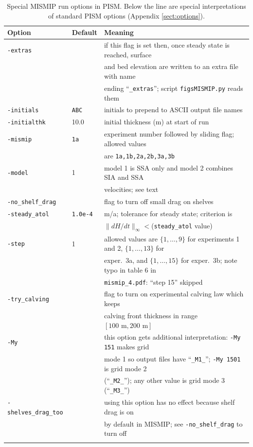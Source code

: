 \documentclass[11pt,final]{amsart}
\begin{document}
\begin{table}[ht]
\caption{Special MISMIP run options in PISM.  Below the line are special interpretations of standard PISM options (Appendix \ref{sect:options}).}\label{tab:MISMIPoptions}
\small
\begin{tabular}{@{}lll}\hline
\textbf{Option} & \textbf{Default} & \textbf{Meaning} \\ \hline
\verb|-extras| &  & if this flag is set then, once steady state is reached, surface \\
               &  & and bed elevation are written to an extra file with name \\
               &  & ending ``\verb|_extras|''; script \verb|figsMISMIP.py| reads them \\
\verb|-initials| & \verb|ABC| & initials to prepend to ASCII output file names \\
\verb|-initialthk| & 10.0 & initial thickness (m) at start of run \\
\verb|-mismip| & \verb|1a| & experiment number followed by sliding flag; allowed values \\
               &  & are \verb|1a,1b,2a,2b,3a,3b| \\
\verb|-model| & 1 & model 1 is SSA only and model 2 combines SIA and SSA  \\
              &   & velocities; see text \\
\verb|-no_shelf_drag| &  & flag to turn off small drag on shelves \\
\verb|-steady_atol| & \verb|1.0e-4| & m/a; tolerance for steady state; criterion is \\
                    & & $\|dH/dt\|_\infty <$(\verb|steady_atol| value) \\
\verb|-step| & 1 & allowed values are $\{1,\dots,9\}$ for experiments 1 and 2, $\{1,\dots,13\}$ for \\
             &  & exper.~3a, and $\{1,\dots,15\}$ for exper.~3b; note typo in table 6 in  \\
             &  & \verb|mismip_4.pdf|: ``step 15'' skipped \\
\verb|-try_calving| &  & flag to turn on experimental calving law which keeps  \\
                    &  & calving front thickness in range $[100\text{ m},200\text{ m}]$ \\
\hline
\verb|-My| &  & this option gets additional interpretation: \verb|-My 151| makes grid \\
           &  & mode 1 so output files have ``\verb|_M1_|''; \verb|-My 1501| is grid mode 2 \\
           &  & (``\verb|_M2_|''); any other value is grid mode 3 (``\verb|_M3_|'') \\
\verb|-shelves_drag_too| &  & using this option has no effect because shelf drag is on \\
                         &  & by default in MISMIP; see \verb|-no_shelf_drag| to turn off  \\
\hline\normalsize
\end{tabular}\end{table}
\end{document}
